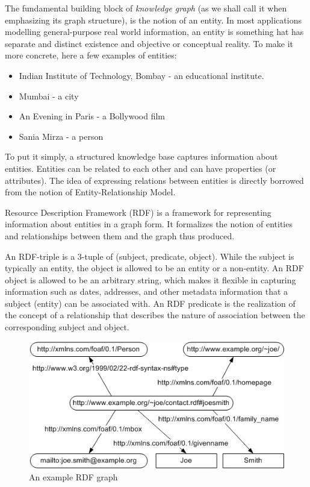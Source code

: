 \documentclass[a4paper, twoside, 12pt]{report}
\begin{document}
The fundamental building block of \emph{knowledge graph} (as we shall call it when emphasizing its graph structure), is the notion of an entity. In most applications modelling general-purpose real world information, an entity is something hat has separate and distinct existence and objective or conceptual reality. To make it more concrete, here a few examples of entities:
\begin{itemize}
  \item Indian Institute of Technology, Bombay - an educational institute.
  \item Mumbai - a city
  \item An Evening in Paris - a Bollywood film
  \item Sania Mirza - a person
\end{itemize}

To put it simply, a structured knowledge base captures information about entities. Entities can be related to each other and can have properties (or attributes). The idea of expressing relations between entities is directly borrowed from the notion of Entity-Relationship Model.

Resource Description Framework (RDF) is a framework for representing information about entities in a graph form. It formalizes the notion of entities and relationships between them and the graph thus produced.

An RDF-triple is a 3-tuple of (subject, predicate, object). While the subject is typically an entity, the object is allowed to be an entity or a non-entity. An RDF object is allowed to be an arbitrary string, which makes it flexible in capturing information such as dates, addresses, and other metadata information that a subject (entity) can be associated with. An RDF predicate is the realization of the concept of a relationship that describes the nature of association between the corresponding subject and object.

\begin{figure}[h!]
  \includegraphics[scale=0.8]{joe-smith-rdf.jpg}
  \caption{An example RDF graph}
  \label{fig:rdfexample}
\end{figure}
\end{document}
